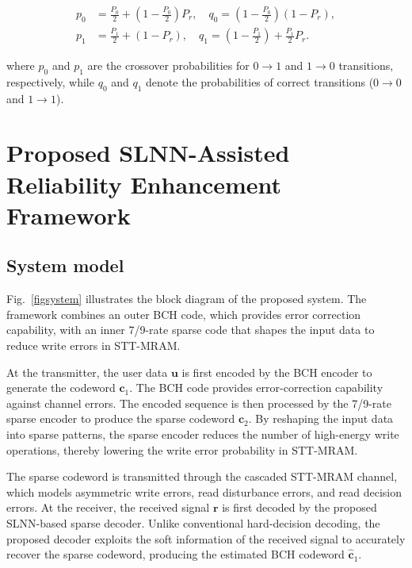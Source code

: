\documentclass[conference]{IEEEtran}
\begin{document}
\begin{equation}
\begin{aligned}
p_0 &= \frac{P_0}{2} + \left(1 - \frac{P_0}{2}\right) P_r, \quad
q_0 = \left(1 - \frac{P_0}{2}\right)(1 - P_r), \\
p_1 &= \frac{P_1}{2} + (1 - P_r), \quad
q_1 = \left(1 - \frac{P_1}{2}\right) + \frac{P_1}{2} P_r.
\end{aligned}
\end{equation}

where $p_0$ and $p_1$ are the crossover probabilities for $0\rightarrow1$ and $1\rightarrow0$ transitions, respectively, while $q_0$ and $q_1$ denote the probabilities of correct transitions ($0\rightarrow0$ and $1\rightarrow1$).




\section{Proposed SLNN-Assisted Reliability Enhancement Framework} \label{section_design}
\subsection{System model}

Fig.~\ref{figsystem} illustrates the block diagram of the proposed system. The framework combines an outer BCH code, which provides error correction capability, with an inner 7/9-rate sparse code that shapes the input data to reduce write errors in STT-MRAM.

At the transmitter, the user data $\mathbf{u}$ is first encoded by the BCH encoder to generate the codeword $\mathbf{c}_1$. The BCH code provides error-correction capability against channel errors. The encoded sequence is then processed by the 7/9-rate sparse encoder to produce the sparse codeword $\mathbf{c}_2$. By reshaping the input data into sparse patterns, the sparse encoder reduces the number of high-energy write operations, thereby lowering the write error probability in STT-MRAM.

The sparse codeword is transmitted through the cascaded STT-MRAM channel, which models asymmetric write errors, read disturbance errors, and read decision errors. At the receiver, the received signal $\mathbf{r}$ is first decoded by the proposed SLNN-based sparse decoder. Unlike conventional hard-decision decoding, the proposed decoder exploits the soft information of the received signal to accurately recover the sparse codeword, producing the estimated BCH codeword $\hat{\mathbf{c}}_1$.
\end{document}

